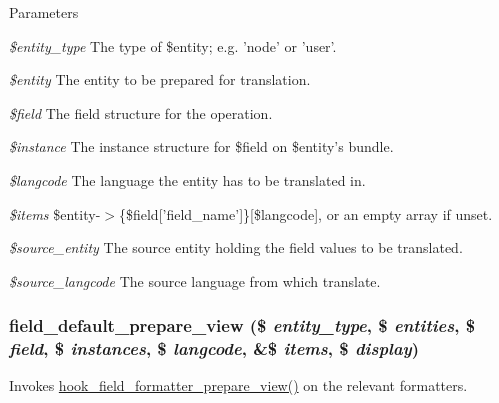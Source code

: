 \begin{DoxyParams}{Parameters}
\item[{\em \$entity\_\-type}]The type of \$entity; e.g. 'node' or 'user'. \item[{\em \$entity}]The entity to be prepared for translation. \item[{\em \$field}]The field structure for the operation. \item[{\em \$instance}]The instance structure for \$field on \$entity's bundle. \item[{\em \$langcode}]The language the entity has to be translated in. \item[{\em \$items}]\$entity-\/$>$\{\$field\mbox{[}'field\_\-name'\mbox{]}\}\mbox{[}\$langcode\mbox{]}, or an empty array if unset. \item[{\em \$source\_\-entity}]The source entity holding the field values to be translated. \item[{\em \$source\_\-langcode}]The source language from which translate. \end{DoxyParams}
\hypertarget{field_8default_8inc_a086fc3e89741c1ba19cc269191d627e5}{
\subsubsection[{field\_\-default\_\-prepare\_\-view}]{\setlength{\rightskip}{0pt plus 5cm}field\_\-default\_\-prepare\_\-view (\$ {\em entity\_\-type}, \/  \$ {\em entities}, \/  \$ {\em field}, \/  \$ {\em instances}, \/  \$ {\em langcode}, \/  \&\$ {\em items}, \/  \$ {\em display})}}
\label{field_8default_8inc_a086fc3e89741c1ba19cc269191d627e5}
Invokes \hyperlink{group__field__formatter_ga2c1856869caa776fd9e5db4af4e0b57b}{hook\_\-field\_\-formatter\_\-prepare\_\-view()} on the relevant formatters.


